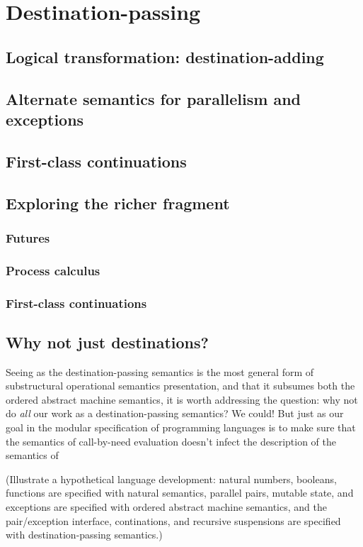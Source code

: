 \chapter{Destination-passing}
\label{chapter-destinations}

\section{Logical transformation: destination-adding}
\label{sec:destination-adding}

\section{Alternate semantics for parallelism and exceptions}
\label{sec:modular-parallelism}

\section{First-class continuations}

\section{Exploring the richer fragment}

\subsection{Futures}

\subsection{Process calculus}

\subsection{First-class continuations}

\section{Why not just destinations?}

Seeing as the destination-passing semantics is the most general form
of substructural operational semantics presentation, and that it
subsumes both the ordered abstract machine semantics, it is worth
addressing the question: why not do {\it all} our work as a
destination-passing semantics? We could! But just as our goal in the
modular specification of programming languages is to make sure that
the semantics of call-by-need evaluation doesn't infect the
description of the semantics of

(Illustrate a hypothetical language development: natural numbers,
booleans, functions are specified with natural semantics, parallel
pairs, mutable state, and exceptions are specified with ordered
abstract machine semantics, and the pair/exception interface,
continations, and recursive suspensions are specified with
destination-passing semantics.)

